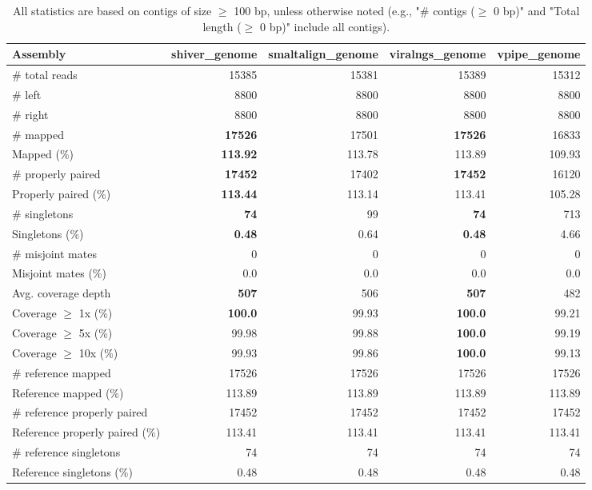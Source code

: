 \documentclass[12pt,a4paper]{article}
\begin{document}
\begin{table}[ht]
\begin{center}
\caption{All statistics are based on contigs of size $\geq$ 100 bp, unless otherwise noted (e.g., "\# contigs ($\geq$ 0 bp)" and "Total length ($\geq$ 0 bp)" include all contigs).}
\begin{tabular}{|l*{4}{|r}|}
\hline
Assembly & shiver\_genome & smaltalign\_genome & viralngs\_genome & vpipe\_genome \\ \hline
\# total reads & 15385 & 15381 & 15389 & 15312 \\ \hline
\# left & 8800 & 8800 & 8800 & 8800 \\ \hline
\# right & 8800 & 8800 & 8800 & 8800 \\ \hline
\# mapped & {\bf 17526} & 17501 & {\bf 17526} & 16833 \\ \hline
Mapped (\%) & {\bf 113.92} & 113.78 & 113.89 & 109.93 \\ \hline
\# properly paired & {\bf 17452} & 17402 & {\bf 17452} & 16120 \\ \hline
Properly paired (\%) & {\bf 113.44} & 113.14 & 113.41 & 105.28 \\ \hline
\# singletons & {\bf 74} & 99 & {\bf 74} & 713 \\ \hline
Singletons (\%) & {\bf 0.48} & 0.64 & {\bf 0.48} & 4.66 \\ \hline
\# misjoint mates & 0 & 0 & 0 & 0 \\ \hline
Misjoint mates (\%) & 0.0 & 0.0 & 0.0 & 0.0 \\ \hline
Avg. coverage depth & {\bf 507} & 506 & {\bf 507} & 482 \\ \hline
Coverage $\geq$ 1x (\%) & {\bf 100.0} & 99.93 & {\bf 100.0} & 99.21 \\ \hline
Coverage $\geq$ 5x (\%) & 99.98 & 99.88 & {\bf 100.0} & 99.19 \\ \hline
Coverage $\geq$ 10x (\%) & 99.93 & 99.86 & {\bf 100.0} & 99.13 \\ \hline
\# reference mapped & 17526 & 17526 & 17526 & 17526 \\ \hline
Reference mapped (\%) & 113.89 & 113.89 & 113.89 & 113.89 \\ \hline
\# reference properly paired & 17452 & 17452 & 17452 & 17452 \\ \hline
Reference properly paired (\%) & 113.41 & 113.41 & 113.41 & 113.41 \\ \hline
\# reference singletons & 74 & 74 & 74 & 74 \\ \hline
Reference singletons (\%) & 0.48 & 0.48 & 0.48 & 0.48 \\ \hline

\end{tabular}
\end{center}
\end{table}
\end{document}

